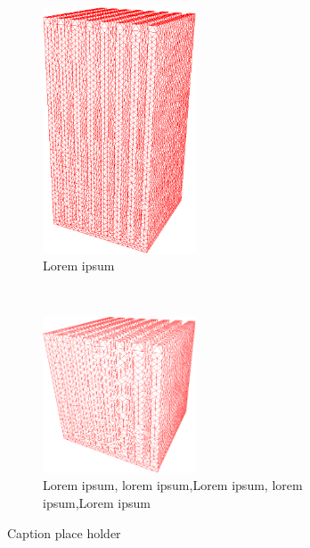 \begin{figure}[t!]
    \centering
    \begin{subfigure}[t]{0.5\textwidth}
        \centering
        \includegraphics[width=0.5\textwidth]{../figures/heatsink8_h205_gmf005_mesh.png}
        \caption{Lorem ipsum}
    \end{subfigure}%
    ~ 
    \begin{subfigure}[t]{0.5\textwidth}
        \centering
        \includegraphics[width=0.5\textwidth]{../figures/heatsink8_h105_gmf005_mesh.png}
        \caption{Lorem ipsum, lorem ipsum,Lorem ipsum, lorem ipsum,Lorem ipsum}
    \end{subfigure}
    \caption{Caption place holder}
\end{figure}